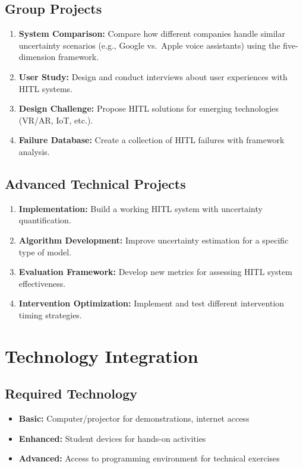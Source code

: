 \subsection{Group Projects}
\begin{enumerate}
    \item \textbf{System Comparison:} Compare how different companies handle similar uncertainty scenarios (e.g., Google vs.\ Apple voice assistants) using the five-dimension framework.
    \item \textbf{User Study:} Design and conduct interviews about user experiences with HITL systems.
    \item \textbf{Design Challenge:} Propose HITL solutions for emerging technologies (VR/AR, IoT, etc.).
    \item \textbf{Failure Database:} Create a collection of HITL failures with framework analysis.
\end{enumerate}

\subsection{Advanced Technical Projects}
\begin{enumerate}
    \item \textbf{Implementation:} Build a working HITL system with uncertainty quantification.
    \item \textbf{Algorithm Development:} Improve uncertainty estimation for a specific type of model.
    \item \textbf{Evaluation Framework:} Develop new metrics for assessing HITL system effectiveness.
    \item \textbf{Intervention Optimization:} Implement and test different intervention timing strategies.
\end{enumerate}

\section{Technology Integration}

\subsection{Required Technology}
\begin{itemize}
    \item \textbf{Basic:} Computer/projector for demonstrations, internet access
    \item \textbf{Enhanced:} Student devices for hands-on activities
    \item \textbf{Advanced:} Access to programming environment for technical exercises
\end{itemize}

